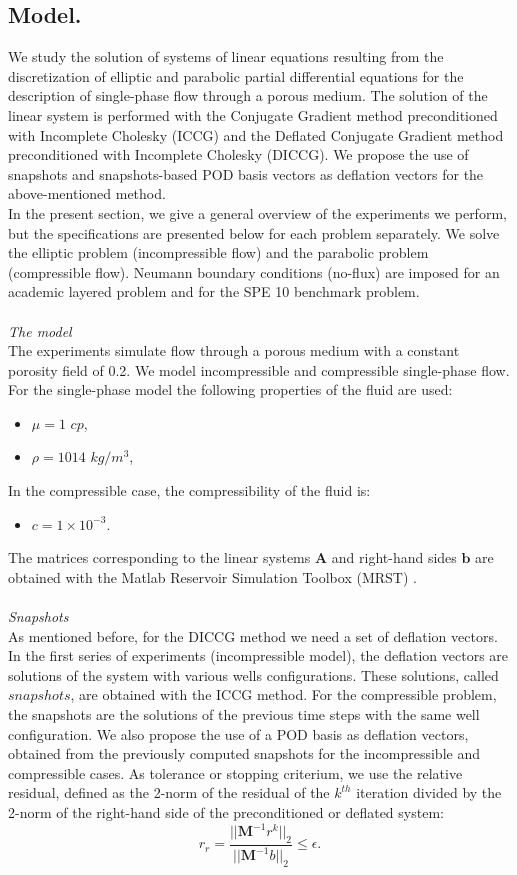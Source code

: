 \documentclass[12pt]{article}
\numberwithin{equation}{section}
\begin{document}
\subsection{Model.}\label{modpro}
\hspace{0.5cm} We study the solution of systems of linear equations resulting from the discretization of elliptic and parabolic partial differential equations for the description of single-phase flow through a porous medium. 
The solution of the linear system is performed with the Conjugate Gradient method preconditioned with Incomplete Cholesky (ICCG) and the Deflated Conjugate Gradient method preconditioned with Incomplete Cholesky (DICCG).
We propose the use of snapshots and snapshots-based POD basis vectors as deflation vectors for the above-mentioned method.\\
In the present section, we give a general overview of the experiments we perform, but the specifications
 are presented below for each problem separately. We solve the elliptic problem (incompressible flow) and the parabolic problem (compressible flow). Neumann boundary conditions (no-flux) are imposed for an academic layered problem and for the SPE 10 benchmark problem.
\\ \\
\emph{The model}\\
The experiments simulate flow through a porous medium with a constant porosity field of 0.2.
We model incompressible and compressible single-phase flow.
For the single-phase model the following properties of the fluid are used:
\begin{itemize}
 \item $\mu = 1$ $cp$,
 \item $\rho = 1014$ $kg/m^3$,
\end{itemize}
In the compressible case, the compressibility of the fluid is:
\begin{itemize}
 \item $c= 1 \times 10^{-3}$.
\end{itemize}
The matrices corresponding to the linear systems $\mathbf{A}$ and right-hand sides $\mathbf{b}$ are obtained with the Matlab Reservoir Simulation Toolbox (MRST) \cite{Lie13}.
\\ \\
\emph{Snapshots}\\
As mentioned before, for the DICCG method we need a set of deflation vectors. In the first series of
experiments (incompressible model), the deflation vectors are 
solutions of the system with various wells configurations. These solutions, 
called $snapshots$, are obtained with the ICCG method. 
For the compressible problem, the snapshots are the solutions of the previous time steps with the same well configuration. 
We also propose the use of a POD basis as deflation vectors, obtained from the previously computed snapshots for the incompressible and compressible cases.
As tolerance or stopping criterium, we use the relative residual, defined as the 2-norm of the residual of the $k^{th}$ iteration divided by 
the 2-norm of the right-hand side of the preconditioned or deflated system: 
$$r_r=\frac{||\mathbf{M}^{-1}r^k||_2}{||\mathbf{M}^{-1}b||_2}\leq \epsilon.$$
\end{document}
